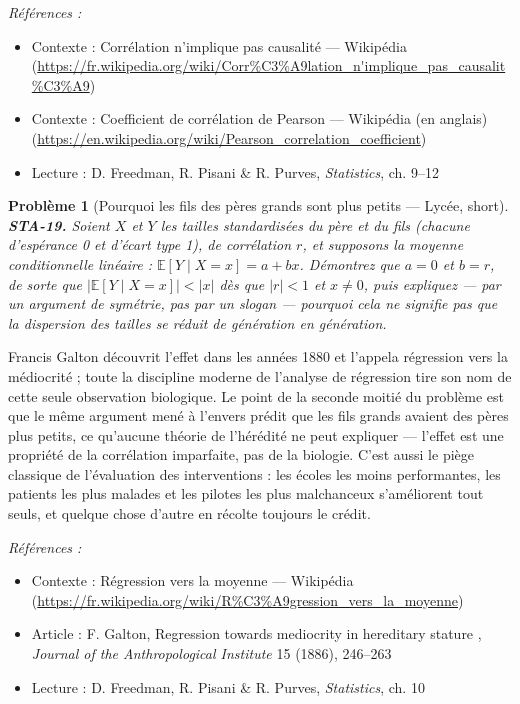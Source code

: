\documentclass[11pt]{article}
\newtheorem{problem}{Problème}
\newenvironment{refs}{\par\small\noindent\emph{Références :}\begin{itemize}\setlength\itemsep{0pt}}{\end{itemize}\normalsize}
\begin{document}
\begin{refs}
\item Contexte : Corrélation n'implique pas causalité --- Wikipédia (\url{https://fr.wikipedia.org/wiki/Corr%C3%A9lation_n'implique_pas_causalit%C3%A9})
\item Contexte : Coefficient de corrélation de Pearson --- Wikipédia (en anglais) (\url{https://en.wikipedia.org/wiki/Pearson_correlation_coefficient})
\item Lecture : D. Freedman, R. Pisani \& R. Purves, \textit{Statistics}, ch. 9--12
\end{refs}

\bigskip

\begin{problem}[{Pourquoi les fils des pères grands sont plus petits --- Lycée, short}]
\textbf{STA-19.} Soient $ X $ et $ Y $ les tailles standardisées du père
et du fils (chacune d'espérance 0 et d'écart type 1), de corrélation $ r $, et supposons la
moyenne conditionnelle linéaire : $ \mathbb{E}[Y \mid X = x] = a + bx $. Démontrez que
$ a = 0 $ et $ b = r $, de sorte que $ |\mathbb{E}[Y \mid X = x]| <|x| $ dès que
$ |r| <1 $ et $ x \ne 0 $, puis expliquez --- par un argument de symétrie, pas par un slogan ---
pourquoi cela ne signifie \textit{pas} que la dispersion des tailles se réduit de génération en
génération.
\end{problem}

\noindent Francis Galton découvrit l'effet dans les années 1880 et l'appela \og{} régression
vers la médiocrité \fg{} ; toute la discipline moderne de l'analyse de régression tire son nom de cette
seule observation biologique. Le point de la seconde moitié du problème est que le même argument
mené à l'envers prédit que les fils grands avaient des pères plus petits, ce qu'aucune théorie de
l'hérédité ne peut expliquer --- l'effet est une propriété de la corrélation imparfaite, pas de la
biologie. C'est aussi le piège classique de l'évaluation des interventions : les écoles les moins
performantes, les patients les plus malades et les pilotes les plus malchanceux s'améliorent tout
seuls, et quelque chose d'autre en récolte toujours le crédit.

\begin{refs}
\item Contexte : Régression vers la moyenne --- Wikipédia (\url{https://fr.wikipedia.org/wiki/R%C3%A9gression_vers_la_moyenne})
\item Article : F. Galton, \og{} Regression towards mediocrity in hereditary stature \fg{}, \textit{Journal of the Anthropological Institute} 15 (1886), 246--263
\item Lecture : D. Freedman, R. Pisani \& R. Purves, \textit{Statistics}, ch. 10
\end{refs}
\end{document}
